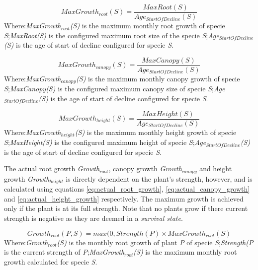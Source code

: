 \begin{equation}
MaxGrowth_{root}(S) = \frac{MaxRoot(S)}{Age_{StartOfDecline}(S)}
\label{eq:max_root_growth}
\end{equation}
Where:\textit{MaxGrowth$_{root}$(S)} is the maximum monthly root growth of specie \textit{S};\textit{MaxRoot(S)} is the configured maximum root size of the specie \textit{S};\textit{Age$_{StartOfDecline}$(S)} is the age of start of decline configured for specie \textit{S}.

\begin{equation}
MaxGrowth_{canopy}(S) = \frac{MaxCanopy(S)}{Age_{StartOfDecline}(S)}
\label{eq:max_canopy_growth}
\end{equation}
Where:\textit{MaxGrowth$_{canopy}$(S)} is the maximum monthly canopy growth of specie \textit{S};\textit{MaxCanopy(S)} is the configured maximum canopy size of specie \textit{S};\textit{Age$_{StartOfDecline}$(S)} is the age of start of decline configured for specie \textit{S}.

\begin{equation}
MaxGrowth_{height}(S) = \frac{MaxHeight(S)}{Age_{StartOfDecline}(S)}
\label{eq:max_height_growth}
\end{equation}
Where:\textit{MaxGrowth$_{height}$(S)} is the maximum monthly height growth of specie \textit{S};\textit{MaxHeight(S)} is the configured maximum height of specie \textit{S};\textit{Age$_{StartOfDecline}$(S)} is the age of start of decline configured for specie \textit{S}.

The actual root growth \textit{Growth$_{root}$}, canopy growth \textit{Growth$_{canopy}$} and height growth \textit{Growth$_{height}$} is directly dependent on the plant's strength, however, and is calculated using equations \ref{eq:actual_root_growth}, \ref{eq:actual_canopy_growth} and \ref{eq:actual_height_growth} respectively. The maximum growth is achieved only if the plant is at its full strength. Note that no plants grow if there current strength is negative as they are deemed in a \textit{survival state}.

\begin{equation}
Growth_{root}(\textit{P},S) = max(0, Strength(\textit{P}) \times  MaxGrowth_{root}(S)
\label{eq:actual_root_growth}
\end{equation}
Where:\textit{Growth$_{root}$(S)} is the monthly root growth of plant \textit{P} of specie \textit{S};\textit{Strength(\textit{P}} is the current strength of \textit{P};\textit{MaxGrowth$_{root}$(S)} is the maximum monthly root growth calculated for specie \textit{S}.


